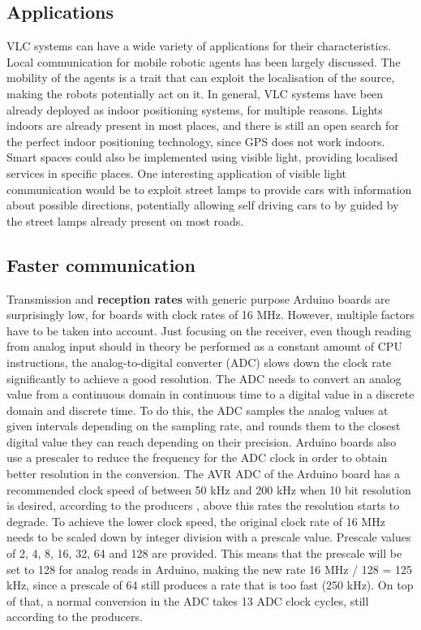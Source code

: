 \subsection{Applications}
VLC systems can have a wide variety of applications for their characteristics.
Local communication for mobile robotic agents has been largely discussed.
The mobility of the agents is a trait that can exploit the localisation of the source, making the robots potentially act on it.
In general, VLC systems have been already deployed as indoor positioning systems, for multiple reasons.
Lights indoors are already present in most places, and there is still an open search for the perfect indoor positioning technology, since GPS does not work indoors.
Smart spaces could also be implemented using visible light, providing localised services in specific places.
One interesting application of visible light communication would be to exploit street lamps to provide cars with information about possible directions, potentially allowing self driving cars to by guided by the street lamps already present on most roads. 


\subsection{Faster communication}
Transmission and \textbf{reception rates} with generic purpose Arduino boards are surprisingly low, for boards with clock rates of 16 MHz. 
However, multiple factors have to be taken into account.
Just focusing on the receiver, even though reading from analog input should in theory be performed as a constant amount of CPU instructions, the analog-to-digital converter (ADC) slows down the clock rate significantly to achieve a good resolution.
The ADC needs to convert an analog value from a continuous domain in continuous time to a digital value in a discrete domain and discrete time.
To do this, the ADC samples the analog values at given intervals depending on the sampling rate, and rounds them to the closest digital value they can reach depending on their precision. 
Arduino boards also use a prescaler to reduce the frequency for the ADC clock in order to obtain better resolution in the conversion.
The AVR ADC of the Arduino board has a recommended clock speed of between 50 kHz and 200 kHz when 10 bit resolution is desired, according to the producers \cite{atmel}, above this rates the resolution starts to degrade.
To achieve the lower clock speed, the original clock rate of 16 MHz needs to be scaled down by integer division with a prescale value.
Prescale values of 2, 4, 8, 16, 32, 64 and 128 are provided. 
This means that the prescale will be set to 128 for analog reads in Arduino, making the new rate 16 MHz / 128 = 125 kHz, since a prescale of 64 still produces a rate that is too fast (250 kHz).
On top of that, a normal conversion in the ADC takes 13 ADC clock cycles, still according to the producers.

